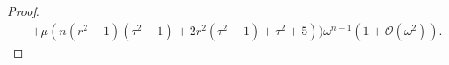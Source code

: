 \documentclass[11pt,reqno,twoside]{amsart}
\theoremstyle{definition}
\theoremstyle{remark}
\numberwithin{equation}{section}
\newcommand{\bu}{\mathbf{u}}
\begin{document}
\begin{proof}
\begin{align}
				&+\mu  \left(n \left(r^2-1\right) \left(\tau ^2-1\right)+2 r^2 \left(\tau ^2-1\right)+\tau ^2+5\right))\omega^{n-1}\left(1+\mathcal{O}\left(\omega^2\right)\right).\label{eq:graa}
			\end{align}

\end{proof}
\end{document}
